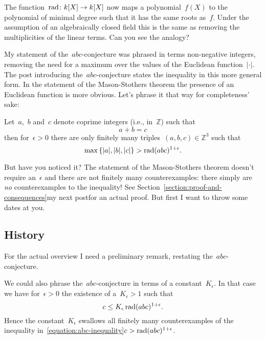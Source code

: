 The function~$\operatorname{rad}\colon k[X]\to k[X]$ now maps a polynomial~$f(X)$ to the polynomial of minimal degree such that it has the same roots as~$f$. Under the assumption of an algebraically closed field this is the same as removing the multiplicities of the linear terms. Can you see the analogy?

\begin{remark}
  My statement of the~$abc$\nobreakdash-conjecture was phrased in terms non-negative integers, removing the need for a maximum over the values of the Euclidean function~$|\cdot|$. The post introducing the~$abc$\nobreakdash-conjecture states the inequality in this more general form. In the statement of the Mason-Stothers theorem the presence of an Euclidean function is more obvious. Let's phrase it that way for completeness' sake:
\end{remark}

\begin{conjecture}
  Let~$a$,~$b$ and~$c$ denote coprime integers (i.e., in~$\mathbb{Z}$) such that
  \begin{equation}
    a+b=c
  \end{equation}
  then for~$\epsilon>0$ there are only finitely many triples~$(a,b,c)\in\mathbb{Z}^3$ such that
  \begin{equation}
    \max\left\{ |a|,|b|,|c| \right\}>\operatorname{rad}(abc)^{1+\epsilon}.
  \end{equation}
\end{conjecture}

But have you noticed it? The statement of the Mason-Stothers theorem doesn't require an~$\epsilon$ and there are not finitely many counterexamples: there simply are \emph{no} counterexamples to the inequality! See \iftex Section~\ref{section:proof-and-consequences}\fi\ifblog my next post\fi for an actual proof. But first I want to throw some dates at you.

\subsection{History}

For the actual overview I need a preliminary remark, restating the~$abc$\nobreakdash-conjecture.
\begin{remark}
  \label{remark:abc-with-factor}
  We could also phrase the~$abc$\nobreakdash-conjecture in terms of a constant~$K_{\epsilon}$. In that case we have for~$\epsilon>0$ the existence of a~$K_{\epsilon}>1$ such that
  \begin{equation}
    c\leq K_{\epsilon}\operatorname{rad}(abc)^{1+\epsilon}.
  \end{equation}
  Hence the constant~$K_{\epsilon}$ swallows all finitely many counterexamples of the inequality \iftex in~\eqref{equation:abc-inequality}\fi\ifblog$c>\operatorname{rad}(abc)^{1+\epsilon}$\fi.
\end{remark}

